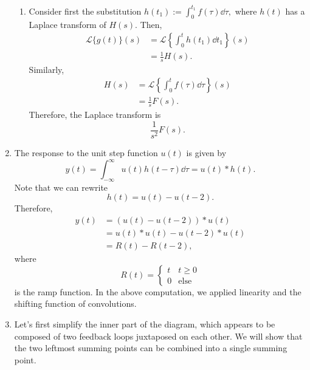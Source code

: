 \documentclass{article}
\numberwithin{equation}{section}
\begin{document}
\begin{enumerate}[label=\textbf{1.\arabic*}]
\begin{enumerate}[label=(\alph*)]
        \item Consider first the substitution $h(t_1):=\int_{0}^{t_1}f(\tau)\dd{\tau},$ where $h(t)$ has a Laplace transform of $H(s).$ Then,
        \begin{align}
            \mathcal{L}\{g(t)\}(s) &= \mathcal{L}\left\{\int_0^t h(t_1)\dd{t}_1\right\}(s) \\ 
            &= \frac{1}{s}H(s).
        \end{align}
        Similarly,
        \begin{align}
            H(s) &= \mathcal{L}\left\{\int_0^t f(\tau)\dd{\tau}\right\}(s) \\ 
            &= \frac{1}{s}F(s).
        \end{align}
        Therefore, the Laplace transform is 
        \begin{equation}
            \boxed{\frac{1}{s^2}F(s)}.
        \end{equation}
    \end{enumerate}
    \item The response to the unit step function $u(t)$ is given by
    \begin{equation}
        y(t) = \int_{-\infty}^{\infty} u(t)h(t-\tau) \dd{\tau} = u(t) * h(t).
    \end{equation}
    Note that we can rewrite 
    \begin{equation}
        h(t) = u(t) -u(t-2).
    \end{equation}
    Therefore,
    \begin{align}
        y(t) &= (u(t)-u(t-2)) * u(t) \\ 
        &= u(t)*u(t) - u(t-2)*u(t) \\ 
        &= R(t) - R(t-2),
    \end{align}
    where 
    \begin{equation}
        R(t) = \begin{cases}
            t & t\ge 0 \\ 
            0 & \text{else}
        \end{cases}
    \end{equation}
    is the ramp function. In the above computation, we applied linearity and the shifting function of convolutions.
    \item Let's first simplify the inner part of the diagram, which appears to be composed of two feedback loops juxtaposed on each other. We will show that the two leftmost summing points can be combined into a single summing point.
    

\end{enumerate}
\end{document}
